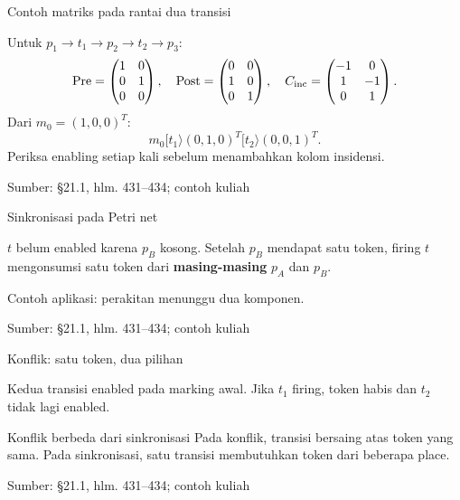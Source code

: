 \documentclass[aspectratio=169,11pt]{beamer}
\newcommand{\source}[1]{%
    \vfill
    \hfill{\tiny\color{gray}Sumber: #1}
}
\newcommand{\mpmat}[1]{\begin{pmatrix}#1\end{pmatrix}}
\newcommand{\Pre}{\mathrm{Pre}}
\newcommand{\Post}{\mathrm{Post}}
\newcommand{\tok}[1]{\fill[AcademicBlue] (#1.center) circle (2.2pt);}
\begin{document}
\begin{frame}{Contoh matriks pada rantai dua transisi}

Untuk $p_1\to t_1\to p_2\to t_2\to p_3$:
\[
\Pre=\mpmat{1&0\\0&1\\0&0},\quad\Post=\mpmat{0&0\\1&0\\0&1},\quad
C_{\rm inc}=\mpmat{-1&0\\1&-1\\0&1}.
\]
Dari $m_0=(1,0,0)^T$:
\[
m_0[t_1\rangle(0,1,0)^T[t_2\rangle(0,0,1)^T.
\]
Periksa enabling setiap kali sebelum menambahkan kolom insidensi.

\source{\S21.1, hlm. 431--434; contoh kuliah}
\end{frame}
\begin{frame}{Sinkronisasi pada Petri net}

\begin{center}\end{center}
$t$ belum enabled karena $p_B$ kosong.
Setelah $p_B$ mendapat satu token, firing $t$ mengonsumsi satu token
dari \textbf{masing-masing} $p_A$ dan $p_B$.
\medskip

Contoh aplikasi: perakitan menunggu dua komponen.

\source{\S21.1, hlm. 431--434; contoh kuliah}
\end{frame}
\begin{frame}{Konflik: satu token, dua pilihan}

\begin{center}\end{center}
Kedua transisi enabled pada marking awal.
Jika $t_1$ firing, token habis dan $t_2$ tidak lagi enabled.
\begin{block}{Konflik berbeda dari sinkronisasi}
Pada konflik, transisi bersaing atas token yang sama.
Pada sinkronisasi, satu transisi membutuhkan token dari beberapa place.
\end{block}

\source{\S21.1, hlm. 431--434; contoh kuliah}
\end{frame}
\end{document}

